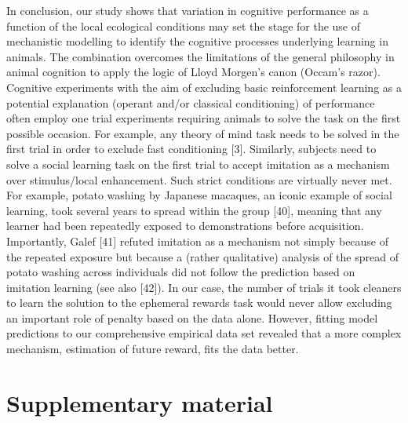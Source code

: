 \documentclass[10pt,letterpaper]{article}
\newcommand{\beginsupplement}{ \setcounter{table}{0}     \renewcommand{\thetable}{S\arabic{table}}\setcounter{figure}{0} \renewcommand{\thefigure}{S\arabic{figure}}}
\begin{document}
In conclusion, our study shows that variation in cognitive performance
as a function of the local ecological conditions may set the stage for
the use of mechanistic modelling to identify the cognitive processes
underlying learning in animals. The combination overcomes the
limitations of the general philosophy in animal cognition to apply the
logic of Lloyd Morgen's canon (Occam's razor). Cognitive experiments
with the aim of excluding basic reinforcement learning as a potential
explanation (operant and/or classical conditioning) of performance often
employ one trial experiments requiring animals to solve the task on the
first possible occasion. For example, any theory of mind task needs to
be solved in the first trial in order to exclude fast conditioning
{[}3{]}. Similarly, subjects need to solve a social learning task on the
first trial to accept imitation as a mechanism over stimulus/local
enhancement. Such strict conditions are virtually never met. For
example, potato washing by Japanese macaques, an iconic example of
social learning, took several years to spread within the group {[}40{]},
meaning that any learner had been repeatedly exposed to demonstrations
before acquisition. Importantly, Galef {[}41{]} refuted imitation as a
mechanism not simply because of the repeated exposure but because a
(rather qualitative) analysis of the spread of potato washing across
individuals did not follow the prediction based on imitation learning
(see also {[}42{]}). In our case, the number of trials it took cleaners
to learn the solution to the ephemeral rewards task would never allow
excluding an important role of penalty based on the data alone. However,
fitting model predictions to our comprehensive empirical data set
revealed that a more complex mechanism, estimation of future reward,
fits the data better.

\newpage

\hypertarget{supplementary-material}{%
\section{Supplementary material}\label{supplementary-material}}

\beginsupplement
\end{document}
